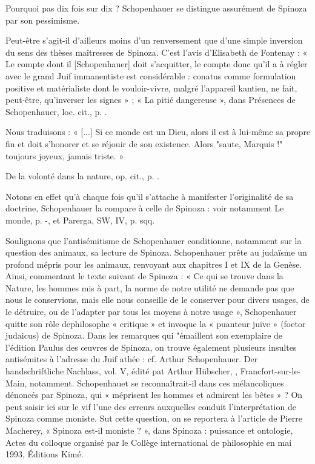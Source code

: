 Pourquoi pas dix fois sur dix ? Schopenhauer se distingue assurément de Spinoza par son pessimisme.

Peut-être s’agit-il d’ailleurs moins d’un renversement que d’une simple inversion du sens des thèses
maîtresses de Spinoza. C’est l’avis d’Elisabeth de Fontenay : « Le compte dont il [Schopenhauer] doit
s’acquitter, le compte donc qu’il a à régler avec le grand Juif immanentiste est considérable : conatus comme
formulation positive et matérialiste dont le vouloir-vivre, malgré l’appareil kantien, ne fait, peut-être,
qu’inverser les signes » ; « La pitié dangereuse », dans Présences de Schopenhauer, loc. cit., p. .

Nous traduisons : « [...] Si ce monde est un Dieu, alors il est à lui-même sa
propre fin et doit s’honorer et se réjouir de son existence. Alors "saute, Marquis !" toujours joyeux, jamais
triste. »

De la volonté dans la nature, op. cit., p. .

Notons en effet qu’à chaque fois qu’il s’attache à manifester l’originalité de sa doctrine, Schopenhauer la
compare à celle de Spinoza : voir notamment Le monde, p. -, et Parerga, SW, IV, p.  sqq.

Soulignons que l’antisémitisme de Schopenhauer conditionne, notamment sur la question des animaux, sa
lecture de Spinoza. Schopenhauer prête au judaïsme un profond mépris pour les animaux, renvoyant aux
chapitres I et IX de la Genèse. Ainsi, commentant le texte suivant de Spinoza : « Ce
qui se trouve dans la Nature, les hommes mis à part, la norme de notre utilité ne demande pas que nous le
conservions, mais elle nous conseille de le conserver pour divers usages, de le détruire, ou de l’adapter par
tous les moyens à notre usage », Schopenhauer quitte son rôle dephilosophe « critique » et invoque la « puanteur
juive » (foetor judaicus) de Spinoza. Dans
les remarques qui "émaillent son exemplaire de l’édition Paulus des œuvres de Spinoza, on trouve également
plusieurs insultes antisémites à l’adresse du Juif athée : cf. Arthur Schopenhauer. Der handschriftliche
Nachlass, vol. V, édité pat Arthur Hübscher, , Francfort-sur-le-Main, notamment.
Schopenhauet se reconnaîtrait-il dans ces mélancoliques dénoncés par Spinoza, qui « méprisent les hommes
et admirent les bêtes » ?
 On peut saisir ici sur le vif l’une des erreurs auxquelles conduit l’interprétation de Spinoza comme
moniste. Sut cette question, on se reportera à l’article de Pierre Macherey, « Spinoza est-il moniste ? », dans
Spinoza : puissance et ontologie, Actes du colloque organisé par le Collège international de philosophie en
mai 1993, Éditions Kimé.

